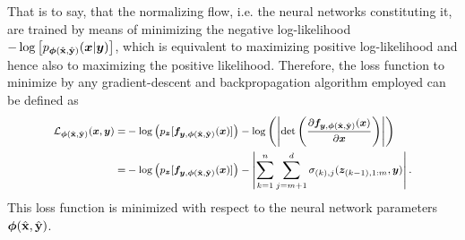 \documentclass[a4paper,12pt]{report}
\begin{document}
That is to say, that the normalizing flow, i.e. the neural networks constituting it, are trained by means of minimizing the negative log-likelihood $-\log\left[p_{\bm{\phi}(\hat{\boldsymbol{\mathbf{x}}},\hat{\boldsymbol{\mathbf{y}}})}(\bm{x}|\bm{y})\right]$, which is equivalent to maximizing positive log-likelihood and hence also to maximizing the positive likelihood. Therefore, the loss function to minimize by any gradient-descent and backpropagation algorithm employed can be defined as 
\begin{align}\footnotesize
\begin{aligned}
\mathcal{L}_{\bm{\phi}(\hat{\boldsymbol{\mathbf{x}}},\hat{\boldsymbol{\mathbf{y}}})}(\bm{x},\bm{y}) =&  -\log\left(p_{\bm{z}}[\bm{f}_{\bm{y},\bm{\phi}(\hat{\boldsymbol{\mathbf{x}}},\hat{\boldsymbol{\mathbf{y}}})}(\bm{x})]\right) - \log\left(\left|\det\left(\frac{\partial \bm{f}_{\bm{y},\bm{\phi}(\hat{\boldsymbol{\mathbf{x}}},\hat{\boldsymbol{\mathbf{y}}})}(\bm{x})}{\partial \bm{x}}\right)\right|\right) \\
=& -\log\left(p_{\bm{z}}[\bm{f}_{\bm{y},\bm{\phi}(\hat{\boldsymbol{\mathbf{x}}},\hat{\boldsymbol{\mathbf{y}}})}(\bm{x})]\right) - \left|\sum_{k = 1}^{n}\sum_{j = m+1}^{d}\sigma_{(k),j}(\bm{z}_{(k-1),1:m},\bm{y})\right|.
\end{aligned}
\end{align} This loss function is minimized with respect to the neural network parameters $\bm{\phi}(\hat{\boldsymbol{\mathbf{x}}},\hat{\boldsymbol{\mathbf{y}}})$.


%
%
\end{document}

